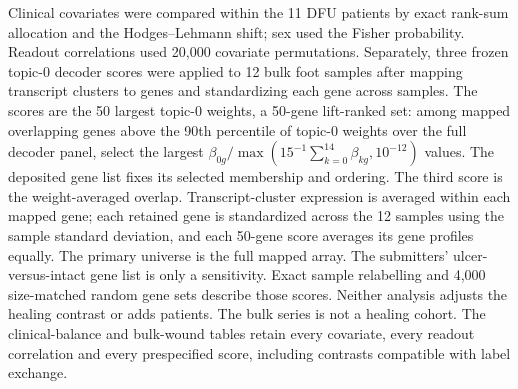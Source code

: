 \documentclass[10pt,a4paper]{article}
\begin{document}
Clinical covariates were compared within the 11 DFU patients by exact rank-sum allocation and the Hodges--Lehmann shift; sex used the Fisher probability. Readout correlations used 20,000 covariate permutations. Separately, three frozen topic-0 decoder scores were applied to 12 bulk foot samples after mapping transcript clusters to genes and standardizing each gene across samples. The scores are the 50 largest topic-0 weights, a 50-gene lift-ranked set: among mapped overlapping genes above the 90th percentile of topic-0 weights over the full decoder panel, select the largest $\beta_{0g}/\max(15^{-1}\sum_{k=0}^{14}\beta_{kg},10^{-12})$ values. The deposited gene list fixes its selected membership and ordering. The third score is the weight-averaged overlap. Transcript-cluster expression is averaged within each mapped gene; each retained gene is standardized across the 12 samples using the sample standard deviation, and each 50-gene score averages its gene profiles equally. The primary universe is the full mapped array. The submitters' ulcer-versus-intact gene list is only a sensitivity. Exact sample relabelling and 4,000 size-matched random gene sets describe those scores. Neither analysis adjusts the healing contrast or adds patients. The bulk series is not a healing cohort.
The clinical-balance and bulk-wound tables retain every covariate, every readout correlation and every prespecified score, including contrasts compatible with label exchange.
\end{document}
